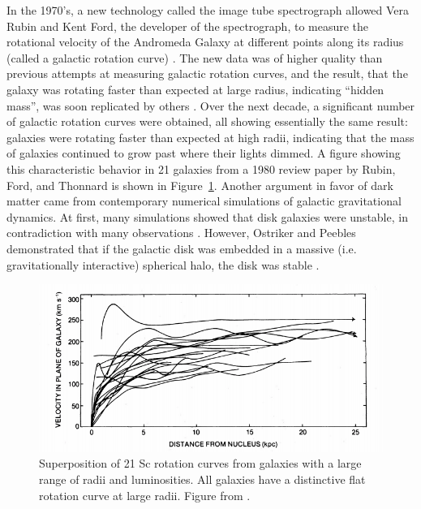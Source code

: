 In the 1970's, a new technology called the image tube spectrograph allowed Vera Rubin and Kent Ford, the developer of the spectrograph, to measure the rotational velocity of the Andromeda Galaxy at different points along its radius (called a galactic rotation curve) \cite{Rubin1970}. The new data was of higher quality than previous attempts at measuring galactic rotation curves, and the result, that the galaxy was rotating faster than expected at large radius, indicating ``hidden mass'', was soon replicated by others \cite{Bertone2016}. Over the next decade, a significant number of galactic rotation curves were obtained, all showing essentially the same result: galaxies were rotating faster than expected at high radii, indicating that the mass of galaxies continued to grow past where their lights dimmed. A figure showing this characteristic behavior in 21 galaxies from a 1980 review paper by Rubin, Ford, and Thonnard is shown in Figure~\ref{fig:curves}. Another argument in favor of dark matter came from contemporary numerical simulations of galactic gravitational dynamics. At first, many simulations showed that disk galaxies were unstable, in contradiction with many observations \cite{Bertone2016}. However, Ostriker and Peebles demonstrated that if the galactic disk was embedded in a massive (i.e. gravitationally interactive) spherical halo, the disk was stable \cite{Peebles1973}.

\begin{figure}[htbp]
\begin{center}
\includegraphics[width=\textwidth]{figures/theory/rot_curves.png}
\caption{Superposition of 21 Sc rotation curves from galaxies with a large range of radii and luminosities. All galaxies have a distinctive flat rotation curve at large radii. Figure from \cite{Rubin1980}.}
\label{fig:curves}
\end{center}
\end{figure}


